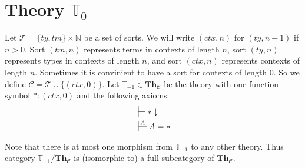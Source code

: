 \documentclass{amsart}
\theoremstyle{definition}
\theoremstyle{remark}
\newcommand{\cat}[1]{\mathbf{#1}}
\newcommand{\Th}{\cat{Th}}
\newcommand{\ThC}{\Th_{\mathcal{C}}}
\numberwithin{figure}{section}
\begin{document}
\label{sec:T0}
\section{Theory $\mathbb{T}_0$}

Let $\mathcal{T} = \{ ty, tm \} \times \mathbb{N}$ be a set of sorts.
We will write $(ctx,n)$ for $(ty,n-1)$ if $n > 0$.
Sort $(tm,n)$ represents terms in contexts of length $n$, sort $(ty,n)$ represents types in contexts of length $n$, and sort $(ctx,n)$ represents contexts of length $n$.
Sometimes it is convinient to have a sort for contexts of length 0.
So we define $\mathcal{C} = \mathcal{T} \cup \{ (ctx,0) \}$.
Let $\mathbb{T}_{-1} \in \ThC$ be the theory with one function symbol $* : (ctx,0)$ and the following axioms:
\begin{align*}
& \sststile{}{} * \downarrow \\
& \sststile{}{A} A = *
\end{align*}

Note that there is at most one morphism from $\mathbb{T}_{-1}$ to any other theory.
Thus category $\mathbb{T}_{-1}/\ThC$ is (isomorphic to) a full subcategory of $\ThC$.
\end{document}
